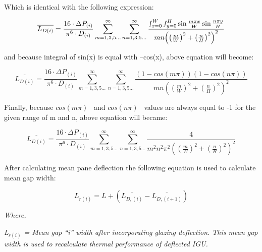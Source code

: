 Which is identical with the following expression:

\begin{equation}
\overline {{L_{D\left( i \right)}}}  = \frac{{16\cdot \Delta {P_{\left( i \right)}}}}{{{\pi ^6}\cdot {D_{\left( i \right)}}}}\mathop \sum \limits_{m = 1,3,5 \ldots }^\infty  \mathop \sum \limits_{n = 1,3,5 \ldots }^\infty  \frac{{\mathop \smallint \nolimits_{x = 0}^W \mathop \smallint \nolimits_{y = 0}^H \sin \frac{{m\pi x}}{W}\sin \frac{{n\pi y}}{H}}}{{mn{{\left( {{{\left( {\frac{m}{W}} \right)}^2} + {{\left( {\frac{n}{H}} \right)}^2}} \right)}^2}}}
\end{equation}

and because integral of sin(x) is equal with --cos(x), above equation will become:

\begin{equation}
\overline {{L_{D\left( i \right)}}}  = \frac{{16\cdot \Delta {P_{\left( i \right)}}}}{{{\pi ^6}\cdot {D_{\left( i \right)}}}}\mathop \sum \limits_{m = 1,3,5 \ldots }^\infty  \mathop \sum \limits_{n = 1,3,5 \ldots }^\infty  \frac{{\left( {1 - cos\left( {m\pi } \right)} \right)\left( {1 - cos\left( {n\pi } \right)} \right)}}{{mn{{\left( {{{\left( {\frac{m}{W}} \right)}^2} + {{\left( {\frac{n}{H}} \right)}^2}} \right)}^2}}}
\end{equation}

Finally, because \(cos\left( {m\pi } \right)\) ~and \(cos\left( {n\pi } \right)\) ~values are always equal to -1 for the given range of m and n, above equation will became:

\begin{equation}
\overline {{L_{D\left( i \right)}}}  = \frac{{16\cdot \Delta {P_{\left( i \right)}}}}{{{\pi ^6}\cdot {D_{\left( i \right)}}}}\mathop \sum \limits_{m = 1,3,5 \ldots }^\infty  \mathop \sum \limits_{n = 1,3,5 \ldots }^\infty  \frac{4}{{{m^2}{n^2}{\pi ^2}{{\left( {{{\left( {\frac{m}{W}} \right)}^2} + {{\left( {\frac{n}{H}} \right)}^2}} \right)}^2}}}
\end{equation}

After calculating mean pane deflection the following equation is used to calculate mean gap width:

\begin{equation}
{L_{r\left( i \right)}} = L + \left( {\overline {{L_{D,\left( i \right)}}}  - \overline {{L_{D,\left( {i + 1} \right)}}} } \right)
\end{equation}

\emph{Where,}

\emph{L\(_{r(i)}\) = Mean gap ``i'' width after incorporating glazing deflection. This mean gap width is used to recalculate thermal performance of deflected IGU.}

